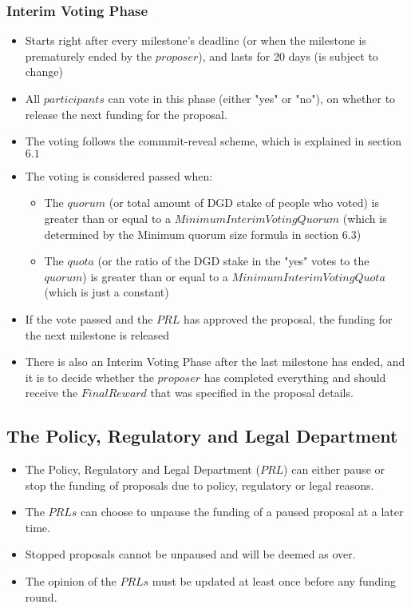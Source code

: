 \documentclass[11pt,a4paper,titlepage]{article}
\begin{document}
{{		\subsubsection{Interim Voting Phase}{
			\begin{itemize}
				\item Starts right after every milestone's deadline (or when the milestone is prematurely ended by the $proposer$), and lasts for 20 days (is subject to change)
				\item All $participants$ can vote in this phase (either "yes" or "no"), on whether to release the next funding for the proposal.
				\item The voting follows the commmit-reveal scheme, which is explained in section $6.1$
				\item The voting is considered passed when:
				\begin{itemize}
					\item The $quorum$ (or total amount of DGD stake of people who voted) is greater than or equal to a $Minimum Interim Voting Quorum$ (which is determined by the Minimum quorum size formula in section $6.3$)				
					\item The $quota$ (or the ratio of the DGD stake in the "yes" votes to the $quorum$) is greater than or equal to a $Minimum Interim Voting Quota$ (which is just a constant)
				\end{itemize}
				\item If the vote passed and the $PRL$ has approved the proposal, the funding for the next milestone is released
				\item There is also an Interim Voting Phase after the last milestone has ended, and it is to decide whether the $proposer$ has completed everything and should receive the $Final Reward$ that was specified in the proposal details.
			\end{itemize}
		}
	}
	\subsection{The Policy, Regulatory and Legal Department}{
		\begin{itemize}
			\item The Policy, Regulatory and Legal Department ($PRL$) can either pause or stop the funding of proposals due to policy, regulatory or legal reasons.
			\item The $PRLs$ can choose to unpause the funding of a paused proposal at a later time.
			\item Stopped proposals cannot be unpaused and will be deemed as over.
			\item The opinion of the $PRLs$ must be updated at least once before any funding round.
		\end{itemize}
	}
}
\end{document}
